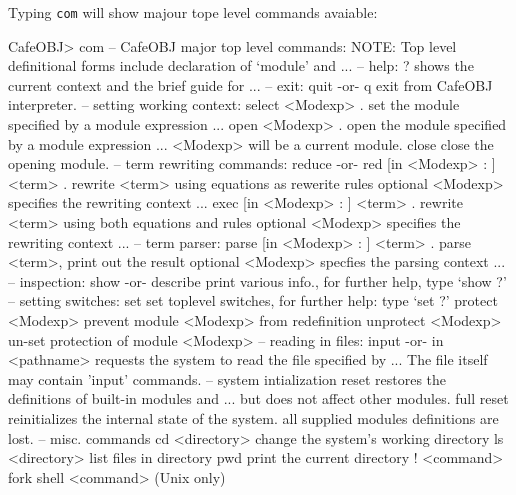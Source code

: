 \documentclass[a4paper]{memoir}
\begin{document}
Typing \texttt{com} will show majour tope level commands avaiable:
\begin{vvtm}
\begin{ccode}
CafeOBJ> com
-- CafeOBJ major top level commands:
   NOTE: Top level definitional forms include declaration of `module' and ...
-- help:
   ?                   shows the current context and the brief guide for ... 
-- exit:
   quit -or- q         exit from CafeOBJ interpreter.
-- setting working context:
   select <Modexp> .   set the module specified by a module expression ...
   open <Modexp> .     open the module specified by a module expression ...
                       <Modexp> will be a current module.
   close               close the opening module.
-- term rewriting commands:
   reduce -or-
   red [in <Modexp> : ] <term> . 
                       rewrite <term> using equations as rewerite rules
                       optional <Modexp> specifies the rewriting context ...
   exec [in <Modexp> : ] <term> .
                       rewrite <term> using both equations and rules
                       optional <Modexp> specifies the rewriting context ...
-- term parser:
  parse [in <Modexp> : ] <term> . 
                       parse <term>, print out the result
                       optional <Modexp> specfies the parsing context ...
-- inspection:
   show -or- describe  print various info., for further help, type `show ?'
-- setting switches:
   set                 set toplevel switches, for further help: type `set ?'
   protect <Modexp>    prevent module <Modexp> from redefinition
   unprotect <Modexp>  un-set protection of module <Modexp>
-- reading in files:
  input -or-
  in <pathname>        requests the system to read the file specified by ...
                       The file itself may contain 'input' commands.
-- system intialization
  reset                restores the definitions of built-in modules and ...
                       but does not affect other modules.
  full reset           reinitializes the internal state of the system. 
                       all supplied modules definitions are lost.
-- misc. commands
  cd <directory>       change the system's working directory
  ls <directory>       list files in directory
  pwd                  print the current directory
  ! <command>          fork shell <command> (Unix only)
\end{ccode}
\end{vvtm}
\end{document}
